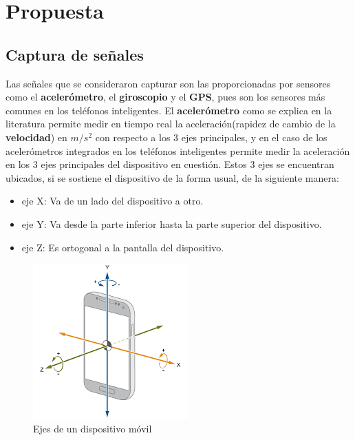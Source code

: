 \chapter{Propuesta}\label{chapter:proposal}

\section{Captura de señales}
	Las señales que se consideraron capturar son las proporcionadas por sensores como el \textbf{acelerómetro},
	el \textbf{giroscopio} y el \textbf{GPS}, pues son los sensores más comunes en los teléfonos inteligentes. El
	\textbf{acelerómetro} como se explica en la literatura permite medir en tiempo real la aceleración(rapidez de
	cambio de la \textbf{velocidad}) en $m/s^2$ con respecto a los 3 ejes principales, y en el caso de los
	acelerómetros integrados en los teléfonos inteligentes permite medir la aceleración en los 3 ejes
	principales del dispositivo en cuestión. Estos 3 ejes se encuentran ubicados, si se sostiene el
	dispositivo de la forma usual, de la siguiente manera:

	\begin{itemize}
		\item eje X: Va de un lado del dispositivo a otro.
		\item eje Y: Va desde la parte inferior hasta la parte superior del dispositivo.
		\item eje Z: Es ortogonal a la pantalla del dispositivo.
	\end{itemize}
	
	\begin{figure}[htb]
		\centering
		\includegraphics[scale = 0.5]{Graphics/mobile_phone_axis.png}
		\caption{Ejes de un dispositivo móvil}
		\label{fig:1}
	\end{figure}


